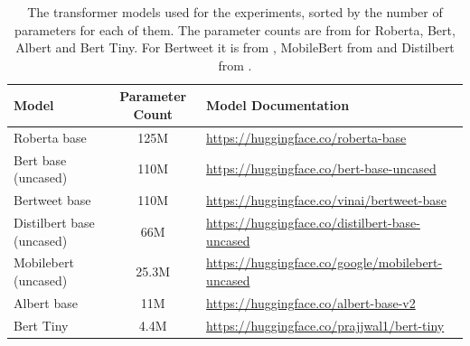 \begin{table}[ht]
    \captionsetup{font=small}
    \centering
    \begin{tabularx}{\textwidth}{|l|c|X|}
        \hline
        \rowcolor[gray]{0.7}
        \textbf{Model} & \textbf{Parameter Count} & \textbf{Model Documentation} \\
        \hline
        Roberta base & 125M & \small{\url{https://huggingface.co/roberta-base}} \\
        \hline 
        Bert base (uncased) & 110M & \small{\url{https://huggingface.co/bert-base-uncased}} \\
        \hline
        Bertweet base & 110M & \small{\url{https://huggingface.co/vinai/bertweet-base}} \\
        \hline
        Distilbert base (uncased) & 66M & \small{\url{https://huggingface.co/distilbert-base-uncased}} \\
        \hline
        Mobilebert (uncased) & 25.3M & \small{\url{https://huggingface.co/google/mobilebert-uncased}} \\
        \hline
        Albert base & 11M & \small{\url{https://huggingface.co/albert-base-v2}} \\
        \hline
        Bert Tiny & 4.4M & \small{\url{https://huggingface.co/prajjwal1/bert-tiny}} \\
        \hline
    \end{tabularx}
    \caption{The transformer models used for the experiments, sorted by the number of parameters for each of them. The parameter counts are from \cite{bhargavaGeneralizationNLIWays2021} for Roberta, Bert, Albert and Bert Tiny. For Bertweet it is from \cite{nguyenBERTweetPretrainedLanguage2020}, MobileBert from \cite{sunMobileBERTCompactTaskAgnostic2020} and Distilbert from \cite{sanhDistilBERTDistilledVersion2020}.}    
    \label{tab: model_dtls}
\end{table} 


